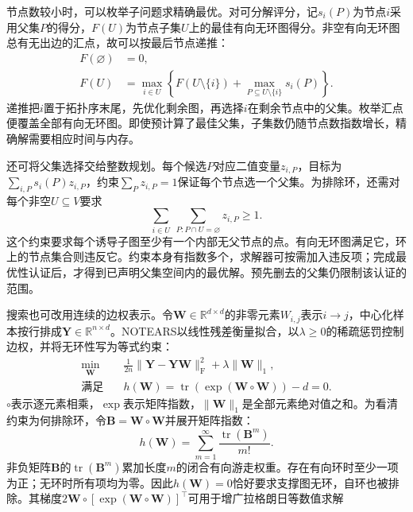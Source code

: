 节点数较小时，可以枚举子问题求精确最优。对可分解评分，记$s_i(P)$为节点$i$采用父集$P$的得分，$F(U)$为节点子集$U$上的最佳有向无环图得分。非空有向无环图总有无出边的汇点，故可以按最后节点递推：
\begin{equation}
  \begin{aligned}
    F(\varnothing)&=0,\\
    F(U)&=\max_{i\in U}\left\{
      F(U\setminus\{i\})
      +\max_{P\subseteq U\setminus\{i\}}s_i(P)\right\}.
  \end{aligned}
  \label{eq:pgm-structure-learning-dp}
\end{equation}
递推把$i$置于拓扑序末尾，先优化剩余图，再选择$i$在剩余节点中的父集。枚举汇点便覆盖全部有向无环图。即使预计算了最佳父集，子集数仍随节点数指数增长，精确解需要相应时间与内存。

还可将父集选择交给整数规划。每个候选$P$对应二值变量$z_{i,P}$，目标为$\sum_{i,P}s_i(P)z_{i,P}$，约束$\sum_Pz_{i,P}=1$保证每个节点选一个父集。为排除环，还需对每个非空$U\subseteq V$要求
\[
  \sum_{i\in U}\ \sum_{P:P\cap U=\varnothing}z_{i,P}\geq1.
\]
这个约束要求每个诱导子图至少有一个内部无父节点的点。有向无环图满足它，环上的节点集合则违反它。约束本身有指数多个，求解器可按需加入违反项；完成最优性认证后，才得到已声明父集空间内的最优解。预先删去的父集仍限制该认证的范围。

搜索也可改用连续的边权表示。令$\bm{W}\in\mathbb{R}^{d\times d}$的非零元素$W_{i,j}$表示$i\to j$，中心化样本按行排成$\bm{Y}\in\mathbb{R}^{n\times d}$。NOTEARS以线性残差衡量拟合，以$\lambda\geq0$的稀疏惩罚控制边权，并将无环性写为等式约束：
\begin{equation}
  \begin{aligned}
    \min_{\bm{W}}\quad&
      \frac{1}{2n}\lVert\bm{Y}-\bm{Y}\bm{W}\rVert_{\mathrm F}^{2}
      +\lambda\lVert\bm{W}\rVert_1,\\
    \text{满足}\quad&
      h(\bm{W})=
      \operatorname{tr}\!\left(\exp(\bm{W}\circ\bm{W})\right)-d=0.
  \end{aligned}
  \label{eq:pgm-structure-learning-notears}
\end{equation}
$\circ$表示逐元素相乘，$\exp$表示矩阵指数，$\lVert\bm{W}\rVert_1$是全部元素绝对值之和。为看清约束为何排除环，令$\bm{B}=\bm{W}\circ\bm{W}$并展开矩阵指数：
\[
  h(\bm{W})=\sum_{m=1}^{\infty}
     \frac{\operatorname{tr}(\bm{B}^m)}{m!}.
\]
非负矩阵$\bm{B}$的$\operatorname{tr}(\bm{B}^m)$累加长度$m$的闭合有向游走权重。存在有向环时至少一项为正；无环时所有项均为零。因此$h(\bm{W})=0$恰好要求支撑图无环，自环也被排除。其梯度$2\bm{W}\circ[\exp(\bm{W}\circ\bm{W})]^{\top}$可用于增广拉格朗日等数值求解

